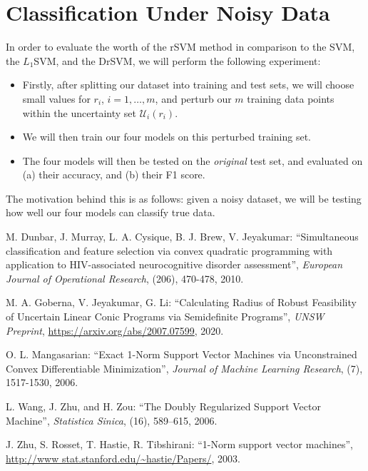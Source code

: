 \documentclass[11pt]{article}
\begin{document}
\section{Classification Under Noisy Data}
In order to evaluate the worth of the rSVM method in comparison to the SVM, the $L_1$SVM, and the DrSVM, we will perform the following experiment:
\begin{itemize}
	\item Firstly, after splitting our dataset into training and test sets, we will choose small values for $r_i$, $i=1,\dots,m$, and perturb our $m$ training data points within the uncertainty set $\mathcal{U}_i(r_i)$. 
	\item We will then train our four models on this perturbed training set. 
	\item The four models will then be tested on the \emph{original} test set, and evaluated on (a) their accuracy, and (b) their F1 score. 
\end{itemize}
The motivation behind this is as follows: given a noisy dataset, we will be testing how well our four models can classify true data. 

\begin{thebibliography}{99}

 M. Dunbar, J. Murray, L. A. Cysique, B. J. Brew, V. Jeyakumar: ``Simultaneous classification and feature selection via convex quadratic programming with application to HIV-associated neurocognitive disorder assessment'', \emph{European Journal of Operational Research}, (206), 470-478, 2010. 

 M. A. Goberna, V. Jeyakumar, G. Li: ``Calculating Radius of Robust Feasibility of Uncertain Linear Conic Programs via Semidefinite Programs'', \emph{UNSW Preprint}, \url{https://arxiv.org/abs/2007.07599}, 2020.

 O. L. Mangasarian: ``Exact 1-Norm Support Vector Machines via Unconstrained Convex Differentiable Minimization'', \emph{Journal of Machine Learning Research}, (7), 1517-1530, 2006.

 L. Wang, J. Zhu, and H. Zou: ``The Doubly Regularized Support Vector Machine'', \emph{Statistica Sinica}, (16), 589–615, 2006.

 J. Zhu, S. Rosset, T. Hastie, R. Tibshirani: ``1-Norm support vector machines'', \url{http://www stat.stanford.edu/~hastie/Papers/}, 2003. 






\end{thebibliography}
\end{document}
